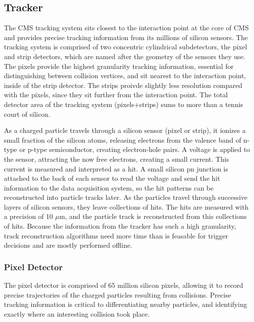 \subsection{Tracker}
The CMS tracking system sits closest to the interaction point at the core of CMS and provides precise tracking information from its millions of silicon sensors.
The tracking system is comprised of two concentric cylindrical subdetectors, the pixel and strip detectors, which are named after the geometry of the sensors they use. 
The pixels provide the highest granularity tracking information, essential for distinguishing between collision vertices, and sit nearest to the interaction point,
inside of the strip detector.
The strips proivde slightly less resolution compared with the pixels, since they sit further from the interaction point. 
The total detector area of the tracking system (pixels+strips) sums to more than a tennis court of silicon.

As a charged particle travels through a silicon sensor (pixel or strip), it ionizes a small fraction of the silicon atoms, releasing electrons from the valence band of n-type or p-type
semiconductor,
creating electron-hole pairs. A voltage is applied to the sensor, attracting the now free electrons, creating a small current. This current is measured and interpreted as a hit.
A small silicon pn junction is attached to the back of each sensor to read the voltage and send the hit information to the data acquisition system,
so the hit patterns can be reconstructed into particle tracks later.   
As the particles travel through successive layers of silicon sensors, they leave collections of hits.
The hits are measured with a precision of 10 $\mu$m, and the particle track is reconstructed from this collections of hits. 
Because the information from the tracker has such a high granularity, track reconstruction algorithms need more time than is feasable for trigger decisions
and are mostly performed offline.


\subsubsection{Pixel Detector}
The pixel detector is comprised of 65 million silicon pixels, allowing it to record
precise trajectories of the charged particles resulting from collisions. Precise tracking information is critical to differentiating nearby particles, and identifying
exactly where an interesting collision took place. 

